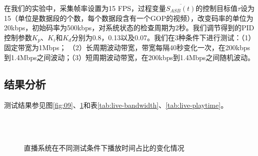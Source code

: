 在我们的实验中，采集帧率设置为15 FPS，过程变量$\overline{S_{ASB}(t)}$的控制目标值$\tau$设为15（单位是数据段的个数，每个数据段含有一个GOP的视频），改变码率的单位为20kbps，初始码率为500kbps，对系统状态的检查周期为2秒。我们调节得到的PID控制参数$K_p$、$K_i$和$K_d$分别为0.8，0.13以及0.07。我们在3种条件下进行测试：（1）固定带宽为1Mbps；
（2）长周期波动带宽，带宽每隔40秒变化一次，在200kbps到1.4Mbps之间波动；（3）短周期波动带宽，在200kbps到1.4Mbps之间随机波动。

\subsection{结果分析}

测试结果参见图\ref{fig:09}、\ref{fig:14}和表\ref{tab:live-bandwidth}、\ref{tab:live-playtime}。

\begin{figure}[!t]
	\centering
	 \\
	 \\
	\caption{直播系统在不同测试条件下播放时间占比的变化情况}
	\label{fig:14}
\end{figure}

